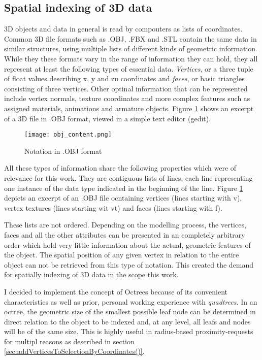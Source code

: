 		\subsection{Spatial indexing of 3D data}
		\label{sec:impl_spatial_indexing_3d}
3D objects and data in general is read by compouters as lists of coordinates. Common 3D file formats such as .OBJ, .FBX and .STL contain the same data in similar structures, using multiple lists of different kinds of geometric information. While they these formats vary in the range of information they can hold, they all represent at least the following types of essential data. \textit{Vertices}, or a three tuple of float values describing x, y and zu coordinates and \textit{faces}, or basic triangles consisting of three vertices. Other optinal information that can be represented include vertex normals, texture coordinates and more complex features such as assigned materials, animations and armature objects. Figure \ref{fig:obj_content} shows an excerpt of a 3D file in .OBJ format, viewed in a simple text editor (gedit).

\begin{figure}[htb]
  \centering
  \texttt{[image: obj\_content.png]}\\ %
  \caption{Notation in .OBJ format}\label{fig:obj_content}
\end{figure}

All these types of information share the following properties which were of relevance for this work. They are contiguous lists of lines, each line representing one instance of the data type indicated in the beginning of the line. Figure \ref{fig:obj_content} depicts an excerpt of an .OBJ file ocntaining vertices (lines starting with v), vertex textures (lines starting wit vt) and faces (lines starting with f).

These lists are not ordered. Depending on the modelling process, the vertices, faces and all the other attributes can be presented in an completely arbitrary order which hold very little information about the actual, geometric features of the object. The spatial position of any given vertex in relation to the entire object can not be retrieved from this type of notation. This created the demand for spatially indexing of 3D data in the scope this work.

I decided to implement the concept of Octrees \cite{Octree} because of its convenient characteristics as well as prior, personal working experience with \textit{quadtrees}. In an octree, the geometric size of the smallest possible leaf node can be determined in direct relation to the object to be indexed and, at any level, all leafs and nodes will be of the same size. This is highly useful in radius-based proximity-requests for multipl reasons as described in section \ref{sec:addVerticesToSelectionByCoordinates()}.


